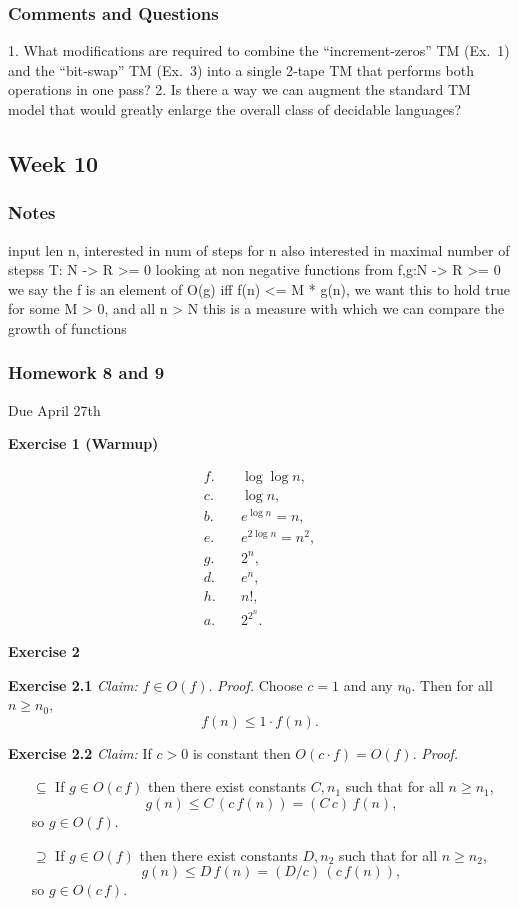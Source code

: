 \documentclass{article}
\theoremstyle{theorem}
\theoremstyle{definition}
\theoremstyle{remark}
\begin{document}
\subsubsection*{Comments and Questions}

1. What modifications are required to combine the “increment‐zeros” TM (Ex. 1) and the “bit‐swap” TM (Ex. 3) into a single 2‑tape TM that performs both operations in one pass?
2. Is there a way we can augment the standard TM model that would greatly enlarge the overall class of decidable languages?

\subsection{Week 10}

\subsubsection*{Notes}

input len n, interested in num of steps for n
also interested in maximal number of stepss
T: N -> R >= 0
looking at non negative functions from f,g:N -> R >= 0
we say the f is an element of O(g) iff f(n) <= M * g(n), we want this to hold true for some M > 0, and all n > N
this is a measure with which we can compare the growth of functions

\subsubsection*{Homework 8 and 9}
Due April 27th

\textbf{Exercise 1 (Warmup)}

\begin{align*}
f.\quad &\log\log n,\\
c.\quad &\log n,\\
b.\quad &e^{\log n} = n,\\
e.\quad &e^{2\log n} = n^2,\\
g.\quad &2^n,\\
d.\quad &e^n,\\
h.\quad &n!,\\
a.\quad &2^{2^n}.
\end{align*}

\textbf{Exercise 2}

\textbf{Exercise 2.1}  
\emph{Claim:} $f\in O(f)$.  
\noindent\emph{Proof.}  
Choose $c=1$ and any $n_0$. Then for all $n\ge n_0$,
\[
  f(n)\le 1\cdot f(n).
\]

\textbf{Exercise 2.2}  
\emph{Claim:} If $c>0$ is constant then $O(c\cdot f)=O(f)$.  
\noindent\emph{Proof.}  
\begin{itemize}
  \item[$\subseteq$] If $g\in O(c\,f)$ then there exist constants $C,n_1$ such that for all $n\ge n_1$,
  \[
    g(n)\le C\,(c\,f(n))=(C\,c)\,f(n),
  \]
  so $g\in O(f)$.
  \item[$\supseteq$] If $g\in O(f)$ then there exist constants $D,n_2$ such that for all $n\ge n_2$,
  \[
    g(n)\le D\,f(n)=(D/c)\,(c\,f(n)),
  \]
  so $g\in O(c\,f)$.
\end{itemize}
\end{document}
